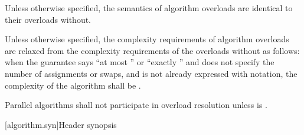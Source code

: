 \pnum
Unless otherwise specified, the semantics of  algorithm
overloads are identical to their overloads without.

\pnum
Unless otherwise specified, the complexity requirements of 
algorithm overloads are relaxed from the complexity requirements of the overloads
without as follows:
when the guarantee says ``at most '' or ``exactly ''
and does not specify the number of assignments or swaps, and 
is not already expressed with  \bigoh{} notation, the complexity of the algorithm
shall be .

\pnum
Parallel algorithms shall not participate in overload resolution unless
 is .

[algorithm.syn]{Header  synopsis}
%

